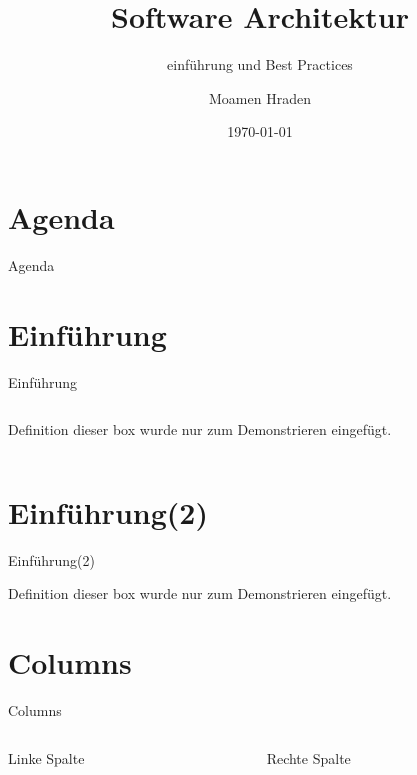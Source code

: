 \documentclass[aspectratio=1610]{beamer}
\title{Software Architektur}
\subtitle{einführung und Best Practices}
\author{Moamen Hraden}
\date{\today}
\begin{document}
	\begin{frame}[plain]
    	\titlepage
	\end{frame} 
	
	
	\section{Agenda}
	\begin{frame}{Agenda}
    	\tableofcontents
	\end{frame}

	
	
	
	\section{Einführung}	
	\begin{frame}{Einführung}
		\begin{columns}
			\centering
			\begin{column}{.4\paperwidth}
				\centering
				\begin{block}{Definition}
					dieser box wurde nur zum Demonstrieren eingefügt.
				\end{block}
			\end{column}
			\begin{column}{.4\paperwidth}
				\centering
			\end{column}
		\end{columns}
	\end{frame}
	
	\section{Einführung(2)}
	\begin{frame}{Einführung(2)}
		\begin{alertblock}{Definition}
			dieser box wurde nur zum Demonstrieren eingefügt.
		\end{alertblock}
	\end{frame}
	
	\section{Columns}
	\begin{frame}{Columns}
		\begin{columns}
			\begin{column}{5cm}
				Linke Spalte
			\end{column}
			\begin{column}{5cm}
				Rechte Spalte
			\end{column}
		\end{columns}
	\end{frame}
	
\end{document}
